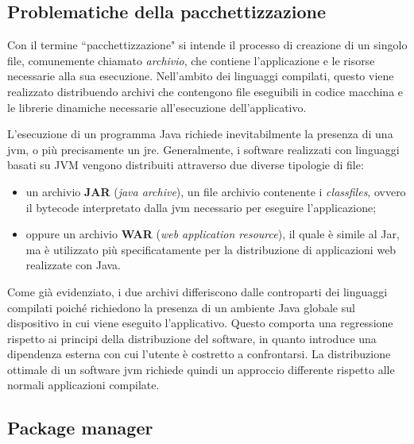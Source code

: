 \subsection{Problematiche della pacchettizzazione}
Con il termine ``pacchettizzazione" si intende il processo di creazione di un singolo file, comunemente chiamato \textit{archivio}, che contiene l'applicazione e le risorse necessarie alla sua esecuzione. Nell'ambito dei linguaggi compilati, questo viene realizzato distribuendo archivi che contengono file eseguibili in codice macchina e le librerie dinamiche necessarie all'esecuzione dell'applicativo.

L'esecuzione di un programma Java richiede inevitabilmente la presenza di una \ac{jvm}, o più precisamente un \ac{jre}. Generalmente, i software realizzati con linguaggi basati su JVM vengono distribuiti attraverso due diverse tipologie di file:
\begin{itemize}
	\item un archivio \textbf{JAR} (\textit{java archive}), un file archivio contenente i \textit{classfiles}, ovvero il bytecode interpretato dalla \ac{jvm} necessario per eseguire l'applicazione;
	\item oppure un archivio \textbf{WAR} (\textit{web application resource}), il quale è simile al Jar, ma è utilizzato più specificatamente per la distribuzione di applicazioni web realizzate con Java.
\end{itemize}
Come già evidenziato, i due archivi differiscono dalle controparti dei linguaggi compilati poiché richiedono la presenza di un ambiente Java globale sul dispositivo in cui viene eseguito l'applicativo. Questo comporta una regressione rispetto ai principi della distribuzione del software, in quanto introduce una dipendenza esterna con cui l'utente è costretto a confrontarsi. La distribuzione ottimale di un software \ac{jvm} richiede quindi un approccio differente rispetto alle normali applicazioni compilate.

\subsection{Package manager}


